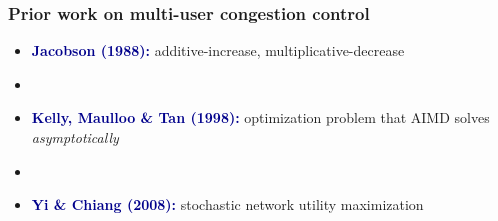 \documentclass[svgnames]{beamer}
\begin{document}

\begin{frame}
\frametitle{Prior work on multi-user congestion control}

\begin{itemize}

\item {\bf \textcolor{DarkBlue}{Jacobson (1988):}} additive-increase, multiplicative-decrease

\item[]

\item {\bf \textcolor{DarkBlue}{Kelly, Maulloo \& Tan (1998):}} optimization problem that AIMD solves {\it asymptotically}

\item[]

\item {\bf \textcolor{DarkBlue}{Yi \& Chiang (2008):}} stochastic network utility maximization

\end{itemize}

\end{frame}
\end{document}
